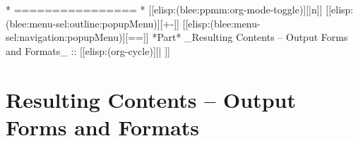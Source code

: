 \begin{whenOrg}


















\begin{whenOrg}
*      ================
*  [[elisp:(blee:ppmm:org-mode-toggle)][|n]] [[elisp:(blee:menu-sel:outline:popupMenu)][+-]] [[elisp:(blee:menu-sel:navigation:popupMenu)][==]]  *Part*   _Resulting Contents -- Output Forms and Formats_ ::  [[elisp:(org-cycle)][| ]]
\end{whenOrg}

\newpage
\part{Resulting Contents -- Output Forms and Formats}



\end{whenOrg}
